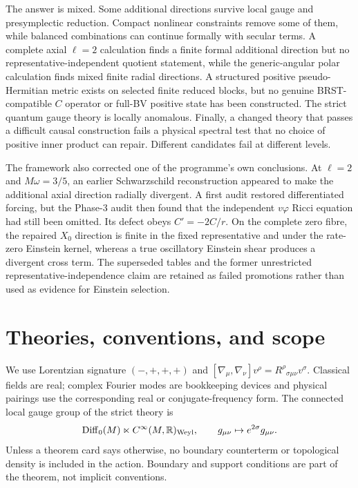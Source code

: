 \documentclass[11pt]{article}
\newcommand{\R}{\mathbb R}
\newcommand{\Diff}{\operatorname{Diff}}
\begin{document}
The answer is mixed.  Some additional directions survive local gauge and
presymplectic reduction.  Compact nonlinear constraints remove some of them,
while balanced combinations can continue formally with secular terms.  A
complete axial $\ell=2$ calculation finds a finite formal additional
direction but no representative-independent quotient statement, while the
generic-angular polar calculation finds mixed finite radial directions.  A
structured positive pseudo-Hermitian metric exists on selected finite
reduced blocks, but no genuine BRST-compatible $C$ operator or full-BV
positive state has been constructed.  The strict quantum gauge theory is
locally anomalous.  Finally, a changed theory that passes a difficult causal
construction fails a physical spectral test that no choice of positive inner
product can repair.  Different candidates fail at different levels.

The framework also corrected one of the programme's own conclusions.  At
$\ell=2$ and $M\omega=3/5$, an earlier Schwarzschild reconstruction appeared
to make the additional axial direction radially divergent.  A first audit
restored differentiated forcing, but the Phase-3 audit then found that the
independent $v\varphi$ Ricci equation had still been omitted.  Its defect
obeys $C'=-2C/r$.  On the complete zero fibre, the repaired $X_0$ direction
is finite in the fixed representative and under the rate-zero Einstein
kernel, whereas a true oscillatory Einstein shear produces a divergent cross
term.  The superseded tables and the former unrestricted
representative-independence claim are retained as failed promotions rather
than used as evidence for Einstein selection.

\section{Theories, conventions, and scope}

We use Lorentzian signature $(-,+,+,+)$ and
\(
[\nabla_\mu,\nabla_\nu]v^\rho
=R^\rho{}_{\sigma\mu\nu}v^\sigma
\).
Classical fields are real; complex Fourier modes are bookkeeping devices and
physical pairings use the corresponding real or conjugate-frequency form.
The connected local gauge group of the strict theory is
\begin{equation}
 \Diff_0(M)\ltimes C^\infty(M,\R)_{\rm Weyl},
 \qquad g_{\mu\nu}\mapsto e^{2\sigma}g_{\mu\nu}.
\end{equation}
Unless a theorem card says otherwise, no boundary counterterm or topological
density is included in the action.  Boundary and support conditions are part
of the theorem, not implicit conventions.
\end{document}
